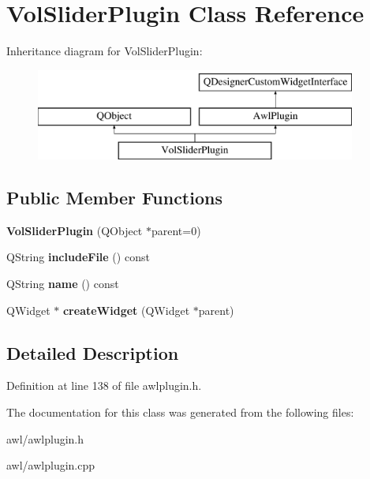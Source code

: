\hypertarget{class_vol_slider_plugin}{}\section{Vol\+Slider\+Plugin Class Reference}
\label{class_vol_slider_plugin}
Inheritance diagram for Vol\+Slider\+Plugin\+:\begin{figure}[H]
\begin{center}
\leavevmode
\includegraphics[height=3.000000cm]{class_vol_slider_plugin}
\end{center}
\end{figure}
\subsection*{Public Member Functions}
\begin{DoxyCompactItemize}
\item 
\mbox{\label{class_vol_slider_plugin_a5e0582f34a98bcb523186a8be832882b}} 
{\bfseries Vol\+Slider\+Plugin} (Q\+Object $\ast$parent=0)
\item 
\mbox{\label{class_vol_slider_plugin_af1b54599cf3a20583d5335b3c6031037}} 
Q\+String {\bfseries include\+File} () const
\item 
\mbox{\label{class_vol_slider_plugin_a3d0b4e7bae3b3790fa7ee07110d3c1c4}} 
Q\+String {\bfseries name} () const
\item 
\mbox{\label{class_vol_slider_plugin_a41f949ff64a0c02537eec5b520324cda}} 
Q\+Widget $\ast$ {\bfseries create\+Widget} (Q\+Widget $\ast$parent)
\end{DoxyCompactItemize}


\subsection{Detailed Description}


Definition at line 138 of file awlplugin.\+h.



The documentation for this class was generated from the following files\+:\begin{DoxyCompactItemize}
\item 
awl/awlplugin.\+h\item 
awl/awlplugin.\+cpp\end{DoxyCompactItemize}

